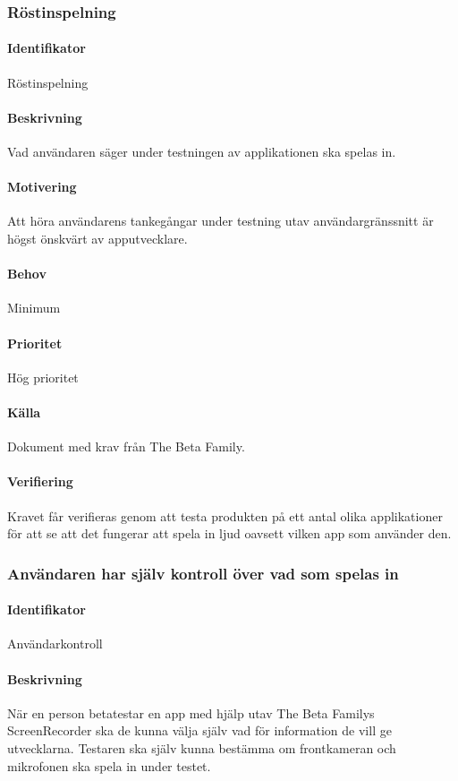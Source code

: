 \subsubsection{Röstinspelning}
\paragraph{Identifikator}
Röstinspelning
\paragraph{Beskrivning}
Vad användaren säger under testningen av applikationen ska spelas in.
\paragraph{Motivering}
Att höra användarens tankegångar under testning utav användargränssnitt är högst önskvärt av apputvecklare.
\paragraph{Behov}
Minimum
\paragraph{Prioritet}
Hög prioritet
\paragraph{Källa}
Dokument med krav från The Beta Family.
\paragraph{Verifiering}
Kravet får verifieras genom att testa produkten på ett antal olika applikationer för att se att det fungerar att spela in ljud oavsett vilken app som använder den.


\subsubsection{Användaren har själv kontroll över vad som spelas in}
\paragraph{Identifikator} 
Användarkontroll
\paragraph{Beskrivning}
När en person betatestar en app med hjälp utav The Beta Familys ScreenRecorder ska de kunna välja själv vad för information de vill ge utvecklarna. Testaren ska själv kunna bestämma om frontkameran och mikrofonen ska spela in under testet. 
